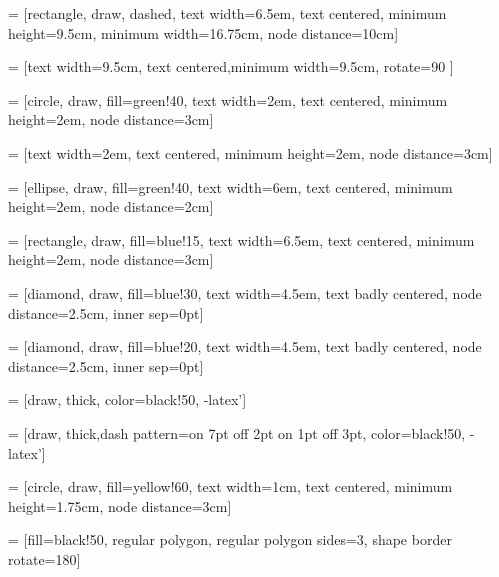 \documentclass{article}
\begin{document}
	 = [rectangle, draw, dashed, text width=6.5em, text centered, minimum height=9.5cm, minimum width=16.75cm, node distance=10cm]
	
	 = [text width=9.5cm, text centered,minimum width=9.5cm, rotate=90 ]
	
	 = [circle, draw, fill=green!40, text width=2em, text centered, minimum height=2em, node distance=3cm]
	
	 = [text width=2em, text centered, minimum height=2em, node distance=3cm]
	
	 = [ellipse, draw, fill=green!40, text width=6em, text centered, minimum height=2em, node distance=2cm]
	
	 = [rectangle, draw, fill=blue!15, text width=6.5em, text centered, minimum height=2em, node distance=3cm]
	
	 = [diamond, draw, fill=blue!30, text width=4.5em, text badly centered, node distance=2.5cm, inner sep=0pt]
	
	 = [diamond, draw, fill=blue!20, text width=4.5em, text badly centered, node distance=2.5cm, inner sep=0pt]
	
	 = [draw, thick, color=black!50, -latex']
	
	 = [draw, thick,dash pattern={on 7pt off 2pt on 1pt off 3pt}, color=black!50, -latex']
	
	 = [circle, draw, fill=yellow!60, text width=1cm, text centered, minimum height=1.75cm, node distance=3cm]
	
	 = [fill=black!50, regular polygon, regular polygon sides=3, shape border rotate=180]
	
\end{document}
